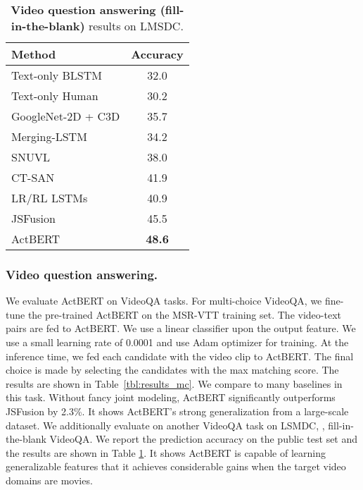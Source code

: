 \documentclass[10pt,twocolumn,letterpaper]{article}
\newcommand{\ours}{ActBERT\xspace}
\begin{document}
\begin{table}
\centering
\small
\begin{tabular}{lc }
\toprule
Method  & {\footnotesize Accuracy}   \\ 
\midrule
Text-only BLSTM \cite{maharaj2017dataset} & 32.0   \\
Text-only Human \cite{maharaj2017dataset} & 30.2  \\
GoogleNet-2D + C3D \cite{maharaj2017dataset}  & 35.7                     \\
Merging-LSTM \cite{mazaheri2016video}   & 34.2                     \\
SNUVL               \cite{yu2016video}  & 38.0                     \\ 
CT-SAN            \cite{yu2017end}     & 41.9                     \\
LR/RL LSTMs            \cite{mazaheri2017video} & 40.9       \\ 
JSFusion \cite{yu2018joint}                & {45.5}                    \\
\midrule
\ours & \textbf{48.6} \\
\bottomrule
\end{tabular}
\caption{\textbf{Video question answering (fill-in-the-blank)} results on LMSDC.
}
\label{tbl:results_mcfib}
\end{table}



\subsubsection{Video question answering.}
We evaluate \ours on VideoQA tasks.
For multi-choice VideoQA, we fine-tune the pre-trained \ours on the MSR-VTT training set. The video-text pairs are fed to \ours. We use a linear classifier upon the output feature.
We use a small learning rate of 0.0001 and use Adam optimizer for training. At  the inference time, we fed each candidate with the video clip to \ours. The final choice is made by selecting the candidates with the max matching score.
The results are shown in Table~\ref{tbl:results_mc}. We compare to many baselines in this task. Without fancy joint modeling, \ours significantly outperforms JSFusion \cite{yu2018joint} by 2.3\%. It shows \ours's strong generalization from a large-scale dataset.
We additionally evaluate on another VideoQA task on LSMDC, \ie, fill-in-the-blank VideoQA.
We report the prediction accuracy on the public test set and the results are shown in Table \ref{tbl:results_mcfib}. It shows \ours is capable of learning generalizable features that it achieves considerable gains when the target video domains are movies.
\end{document}

